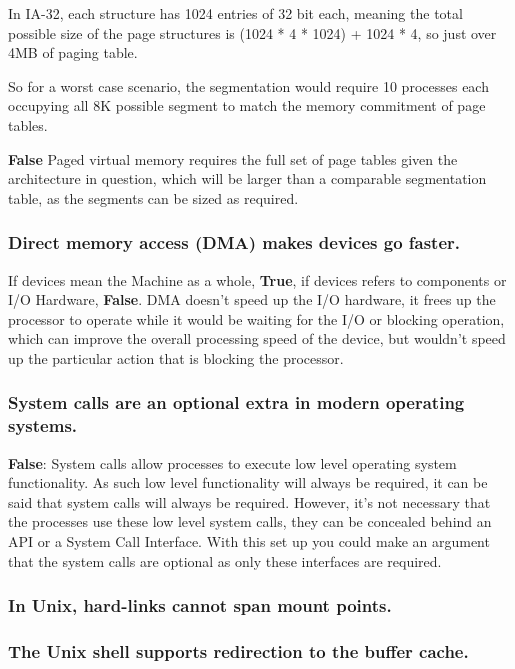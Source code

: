 \documentclass[]{article}
\begin{document}
        In IA-32, each structure has 1024 entries of 32 bit each, meaning the total possible size of the page structures is (1024 * 4 * 1024) + 1024 * 4, so just over 4MB of paging table.

        So for a worst case scenario, the segmentation would require 10 processes each occupying all 8K possible segment to match the memory commitment of page tables.

        \textbf{False} Paged virtual memory requires the full set of page tables given the architecture in question, which will be larger than a comparable segmentation table, as the segments can be sized as required.

        \subsubsection{Direct memory access (DMA) makes devices go faster.}

        If devices mean the Machine as a whole, \textbf{True}, if devices refers to components or I/O Hardware, \textbf{False}. DMA doesn't speed up the I/O hardware, it frees up the processor to operate while it would be waiting for the I/O or blocking operation, which can improve the overall processing speed of the device, but wouldn't speed up the particular action that is blocking the processor.


        \subsubsection{System calls are an optional extra in modern operating systems.}

        \textbf{False}: System calls allow processes to execute low level operating system functionality. As such low level functionality will always be required, it can be said that system calls will always be required. However, it's not necessary that the processes use these low level system calls, they can be concealed behind an API or a System Call Interface. With this set up you could make an argument that the system calls are optional as only these interfaces are required.


        \subsubsection{In Unix, hard-links cannot span mount points.}


        \subsubsection{The Unix shell supports redirection to the buffer cache.}
\end{document}
